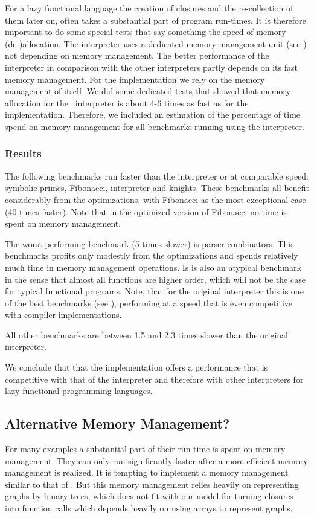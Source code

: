 For a lazy functional language the creation of closures and the re-collection of them later on, often takes a substantial part of program run-times.
It is therefore important to do some special tests that say something the speed of memory (de-)allocation.
The \Sapl interpreter uses a dedicated memory management unit (see \cite{JKP}) not depending on \Java memory management. 
The better performance of the \Sapl interpreter in comparison with the other interpreters partly depends on its fast memory management.
For the \JS implementation we rely on  the memory management of \JS itself.
We did some dedicated tests that showed that memory allocation for the \Java\ \Sapl interpreter is about 4-6 times as fast as for the \JS implementation.
Therefore, we included an estimation of the percentage of time spend on memory management for all benchmarks running using  the \Sapljs interpreter.

\subsubsection{Results}
The following benchmarks run faster than the \Sapl interpreter or at comparable speed: symbolic primes, Fibonacci, interpreter and knights. These benchmarks all benefit considerably from the optimizations, with Fibonacci as the most exceptional case (40 times faster).
Note that in the optimized version of Fibonacci no time is spent on memory management.

The worst performing benchmark (5 times slower) is parser combinators. 
This benchmarks profits only modestly  from the optimizations and spends relatively much time 
in memory management operations. Is is also an atypical benchmark in the sense that almost all functions are higher order, which will not be the case for
typical functional programs. Note, that for the original \Sapl interpreter this is one of the best benchmarks (see \cite{JKP}), 
performing at a speed that is even competitive with compiler implementations. 

All other benchmarks are between 1.5 and 2.3 times slower than the original \Sapl interpreter.

We conclude that that the \Sapljs implementation offers a performance that is competitive with that of the \Sapl interpreter and therefore
with other interpreters for lazy functional programming languages.


\subsection{Alternative Memory Management?}
For many \Sapljs examples a substantial part of their run-time is spent on memory management. 
They can only run significantly faster after a more efficient memory management is realized.
It is tempting to implement a memory management similar to that of \Sapl. 
But this memory management relies heavily on representing graphs by binary trees, 
which does not fit with our model for turning closures into \JS function calls which depends heavily on using arrays to
represent graphs.

